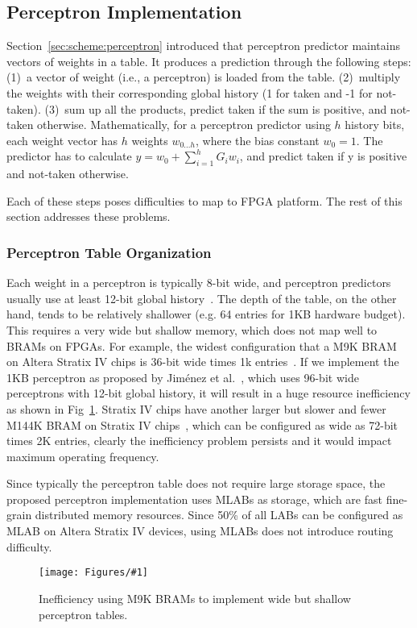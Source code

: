 \documentclass[conference]{IEEEtran}
\newcommand{\kfig}[4]{ %
        \begin{figure}[!t]
        \centering
        \texttt{[image: Figures/\#1]}
        \vspace{-1mm}
        \caption{#3}
        \label{#2}
        \end{figure}
}
\begin{document}
\subsection{Perceptron Implementation}
\label{sec:fpga:perceptron}

Section~\ref{sec:scheme:perceptron} introduced that perceptron predictor maintains vectors of weights in a table. It produces a prediction through the following steps: (1)~a vector of weight (i.e., a perceptron) is loaded from the table. (2)~multiply the weights with their corresponding global history (1 for taken and -1 for not-taken). (3)~sum up all the products, predict taken if the sum is positive, and not-taken otherwise. Mathematically, for a perceptron predictor using $h$ history bits, each weight vector has $h$ weights $w_{0...h}$, where the bias constant $w_0 = 1$. The predictor has to calculate $y = w_0 + \sum_{i=1}^{h} G_iw_i$, and predict taken if y is positive and not-taken otherwise.

Each of these steps poses difficulties to map to FPGA platform. The rest of this section addresses these problems.

\subsubsection{Perceptron Table Organization}
\label{sec:fpga:perceptron:table}
Each weight in a perceptron is typically 8-bit wide, and perceptron predictors usually use at least 12-bit global history~\cite{perceptron}. The depth of the table, on the other hand, tends to be relatively shallower (e.g. 64 entries for 1KB hardware budget). This requires a very wide but shallow memory, which does not map well to BRAMs on FPGAs. For example, the widest configuration that a M9K BRAM on Altera Stratix IV chips is 36-bit wide times 1k entries~\cite{StratixIVM9K}. If we implement the 1KB perceptron as proposed by Jim\'enez et al.~\cite{perceptron}, which uses 96-bit wide perceptrons with 12-bit global history, it will result in a huge resource inefficiency as shown in Fig~\ref{fig:perceptronTable}. Stratix IV chips have another larger but slower and fewer M144K BRAM on Stratix IV chips~\cite{StratixIVM9K}, which can be configured as wide as 72-bit times 2K entries, clearly the inefficiency problem persists and it would impact maximum operating frequency.

Since typically the perceptron table does not require large storage space, the proposed perceptron implementation uses MLABs as storage, which are fast fine-grain distributed memory resources. Since 50\% of all LABs can be configured as MLAB on Altera Stratix IV devices, using MLABs does not introduce routing difficulty.
\kfig{perceptronTable.pdf}{fig:perceptronTable}{Inefficiency using M9K BRAMs to implement wide but shallow perceptron tables.}{angle = 0, trim = 1in 2in 3.4in 0.5in, clip, width=0.3\textwidth}
\end{document}
